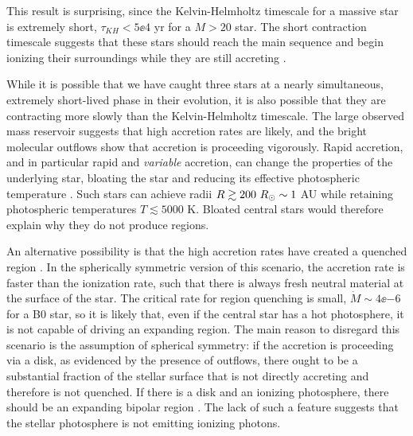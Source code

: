\documentclass{emulateapj}
\begin{document}


This result is surprising, since the Kelvin-Helmholtz timescale for a massive
star is extremely short, $\tau_{KH} < 5\ee{4}$ yr for a $M>20$ \msun star.  The
short contraction timescale suggests that these stars should reach the main
sequence and begin ionizing their surroundings while they are still accreting
\citep{Zinnecker2007a}.

While it is possible that we have caught three stars at a nearly simultaneous,
extremely short-lived phase in their evolution, it is also possible that they
are contracting more slowly than the Kelvin-Helmholtz timescale.  The large
observed mass reservoir suggests that high accretion rates are likely, and the
bright molecular outflows show that accretion is proceeding vigorously.  Rapid
accretion, and in particular rapid and \emph{variable} accretion, can change
the properties of the underlying star, bloating the star and reducing its
effective photospheric temperature \citep{Hosokawa2009a, Smith2012h,
Hosokawa2016a}.  Such stars can achieve radii $R\gtrsim200~R_{\odot} \sim 1$ AU
while retaining photospheric temperatures $T\lesssim5000$ K.  Bloated central
stars would therefore explain why they do not produce \hii regions.

An alternative possibility is that the high accretion rates have created a
quenched \hii region \citep{Walmsley1995b,Osorio1999a,Keto2006a}.  In the
spherically symmetric version of this scenario, the accretion rate is faster
than the ionization rate, such that there is always fresh neutral material 
 at the surface of the star.  The critical rate for \hii region quenching
is small, $\dot{M} \sim 4\ee{-6}$ \msun \peryr for a B0 star, so it is likely
that, even if the central star has a hot photosphere, it is not capable of
driving an expanding \hii region.  The main reason to disregard this scenario
is the assumption of spherical symmetry: if the accretion is proceeding via a
disk, as evidenced by the presence of outflows, there ought to be a substantial
fraction of the stellar surface that is not directly accreting and therefore is
not quenched.  If there is a disk and an ionizing photosphere, there should be
an expanding bipolar \hii region \citep{Keto2006a}.  The lack of such a feature
suggests that the stellar photosphere is not emitting ionizing photons.
\end{document}
